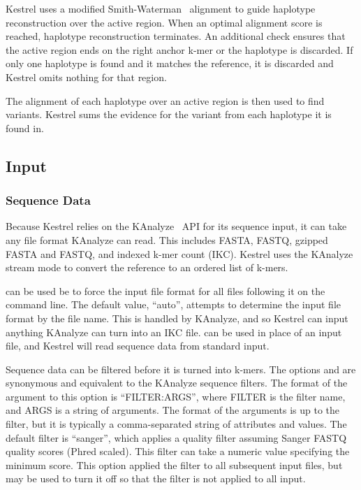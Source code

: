 Kestrel uses a modified Smith-Waterman~\cite{Smith1981} alignment to guide haplotype reconstruction over the active region. When an optimal alignment score is reached, haplotype reconstruction terminates. An additional check ensures that the active region ends on the right anchor k-mer or the haplotype is discarded. If only one haplotype is found and it matches the reference, it is discarded and Kestrel omits nothing for that region.

The alignment of each haplotype over an active region is then used to find variants. Kestrel sums the evidence for the variant from each haplotype it is found in.


\subsection{Input}
\label{sec.process.input}

\subsubsection{Sequence Data}
\label{sec.process.input.seq}
Because Kestrel relies on the KAnalyze~\cite{Audano2014} API for its sequence input, it can take any file format KAnalyze can read. This includes FASTA, FASTQ, gzipped FASTA and FASTQ, and indexed k-mer count (IKC). Kestrel uses the KAnalyze stream mode to convert the reference to an ordered list of k-mers.

 can be used be to force the input file format for all files following it on the command line. The default value, ``auto'', attempts to determine the input file format by the file name. This is handled by KAnalyze, and so Kestrel can input anything KAnalyze can turn into an IKC file.  can be used in place of an input file, and Kestrel will read sequence data from standard input.

Sequence data can be filtered before it is turned into k-mers. The options  and  are synonymous and equivalent to the KAnalyze sequence filters. The format of the argument to this option is ``FILTER:ARGS'', where FILTER is the filter name, and ARGS is a string of arguments. The format of the arguments is up to the filter, but it is typically a comma-separated string of attributes and values. The default filter is ``sanger'', which applies a quality filter assuming Sanger FASTQ quality scores (Phred scaled). This filter can take a numeric value specifying the minimum score. This option applied the filter to all subsequent input files, but  may be used to turn it off so that the filter is not applied to all input.

